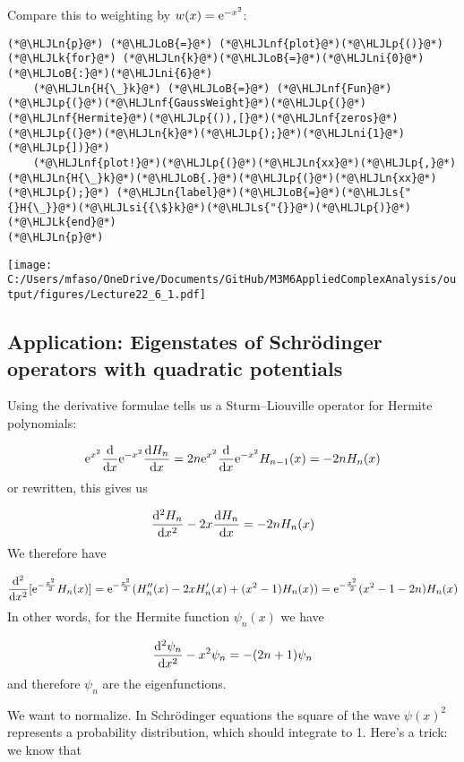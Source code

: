 \documentclass[12pt,landscape]{article}
\newcommand{\HLJLk}[1]{\textcolor[RGB]{148,91,176}{\textbf{#1}}}
\newcommand{\HLJLn}[1]{#1}
\newcommand{\HLJLnf}[1]{\textcolor[RGB]{66,102,213}{#1}}
\newcommand{\HLJLs}[1]{\textcolor[RGB]{201,61,57}{#1}}
\newcommand{\HLJLsi}[1]{#1}
\newcommand{\HLJLni}[1]{\textcolor[RGB]{59,151,46}{#1}}
\newcommand{\HLJLoB}[1]{\textcolor[RGB]{102,102,102}{\textbf{#1}}}
\newcommand{\HLJLp}[1]{#1}
\def\D{ {\rm d} }
\def\E{ {\rm e} }
\def\dx{\D x}
\def\endash{–}
\begin{document}
{Compare this to weighting by $w(x) = \E^{-x^2}$:


\begin{lstlisting}
(*@\HLJLn{p}@*) (*@\HLJLoB{=}@*) (*@\HLJLnf{plot}@*)(*@\HLJLp{()}@*)
(*@\HLJLk{for}@*) (*@\HLJLn{k}@*)(*@\HLJLoB{=}@*)(*@\HLJLni{0}@*)(*@\HLJLoB{:}@*)(*@\HLJLni{6}@*)
    (*@\HLJLn{H{\_}k}@*) (*@\HLJLoB{=}@*) (*@\HLJLnf{Fun}@*)(*@\HLJLp{(}@*)(*@\HLJLnf{GaussWeight}@*)(*@\HLJLp{(}@*)(*@\HLJLnf{Hermite}@*)(*@\HLJLp{()),[}@*)(*@\HLJLnf{zeros}@*)(*@\HLJLp{(}@*)(*@\HLJLn{k}@*)(*@\HLJLp{);}@*)(*@\HLJLni{1}@*)(*@\HLJLp{])}@*)
    (*@\HLJLnf{plot!}@*)(*@\HLJLp{(}@*)(*@\HLJLn{xx}@*)(*@\HLJLp{,}@*) (*@\HLJLn{H{\_}k}@*)(*@\HLJLoB{.}@*)(*@\HLJLp{(}@*)(*@\HLJLn{xx}@*)(*@\HLJLp{);}@*) (*@\HLJLn{label}@*)(*@\HLJLoB{=}@*)(*@\HLJLs{"{}H{\_}}@*)(*@\HLJLsi{{\$}k}@*)(*@\HLJLs{"{}}@*)(*@\HLJLp{)}@*)
(*@\HLJLk{end}@*)
(*@\HLJLn{p}@*)
\end{lstlisting}

\texttt{[image: C:/Users/mfaso/OneDrive/Documents/GitHub/M3M6AppliedComplexAnalysis/output/figures/Lecture22\_6\_1.pdf]}

\subsection{Application:  Eigenstates of Schrödinger operators with quadratic potentials}
Using the derivative formulae tells us a Sturm\ensuremath{\endash}Liouville operator for Hermite polynomials:

\[
\E^{x^2} {\D \over \dx} \E^{-x^2} {\D H_n \over \dx} = 2n \E^{x^2} {\D \over \dx} \E^{-x^2} H_{n-1}(x) = -2nH_n(x)
\]
or rewritten, this gives us

\[
{\D^2 H_n \over \dx^2} -2x {\D H_n \over \dx} = -2nH_n(x)
\]
We therefore have

\[
{\D^2 \over \dx^2}[\E^{-{x^2 \over 2}} H_n(x)] = \E^{-{x^2 \over 2}} (H_n''(x)  -2x H_n'(x) + (x^2-1) H_n(x)) = \E^{-{x^2 \over 2}} (x^2-1-2n) H_n(x)
\]
In other words, for the Hermite function $\psi_n(x)$ we have

\[
{\D^2 \psi_n \over \dx^2} -x^2 \psi_n = -(2n+1) \psi_n
\]
and therefore $\psi_n$ are the eigenfunctions.

We want to normalize.  In Schrödinger equations the square of the wave $\psi(x)^2$ represents a probability distribution, which should integrate to 1. Here's a trick: we know that

}
\end{document}
